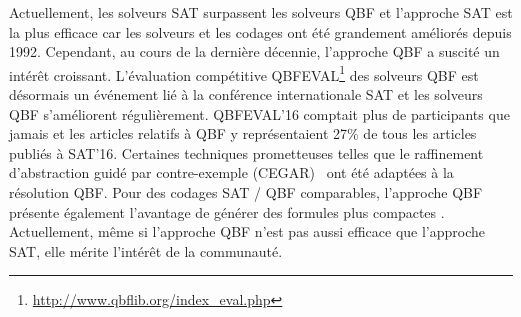 Actuellement, les solveurs SAT surpassent les solveurs QBF et l'approche SAT est la plus efficace car les solveurs et les codages ont été grandement améliorés depuis 1992. Cependant, au cours de la dernière décennie, l'approche QBF a suscité un intérêt croissant. L'évaluation compétitive QBFEVAL\footnote{\url{http://www.qbflib.org/index_eval.php}} des solveurs QBF est désormais un événement lié à la conférence internationale SAT et les solveurs QBF s'améliorent régulièrement. QBFEVAL'16 comptait plus de participants que jamais et les articles relatifs à QBF y représentaient 27\% de tous les articles publiés à SAT'16. %
Certaines techniques prometteuses telles que le raffinement d'abstraction guidé par contre-exemple (CEGAR)~\cite{DBLP:journals/jacm/ClarkeGJLV03,DBLP:conf/ijcai/JanotaM15,DBLP:journals/ai/JanotaKMC16,DBLP:conf/fmcad/RabeT15} ont été adaptées à la résolution QBF.
Pour des codages SAT / QBF comparables, l'approche QBF présente également l'avantage de générer des formules plus compactes \cite{DBLP:conf/ecai/CashmoreFG12}.
Actuellement, même si l'approche QBF n'est pas aussi efficace que l'approche SAT, elle mérite l'intérêt de la communauté.